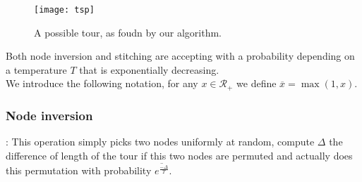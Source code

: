 \documentclass[fontsize=9pt,twocolumns,enabledeprecatedfontcommands]{scrartcl}
\begin{document}
\begin{figure}[hp]
	\centering
	\texttt{[image: tsp]}
	\label{tsp_sol}
	\caption{A possible tour, as foudn by our algorithm.}
\end{figure}


Both node inversion and stitching are accepting with a probability depending on a temperature $T$ that is exponentially decreasing.\\

We introduce the following notation, for any $x \in \mathcal{R}_+$ we define $\overline{x} = \max(1,x)$.

\subsubsection{Node inversion}:
This operation simply picks two nodes uniformly at random, compute $\Delta$ the difference of length of the tour if this two nodes are permuted and actually does this permutation with probability $\overline{e^{\frac{-\Delta}{T}}}$.
\end{document}
